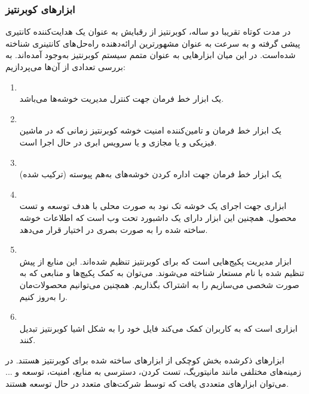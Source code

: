 \subsubsection{ابزارهای کوبرنتیز}

در مدت کوتاه تقریبا دو ساله، کوبرنتیز از رقبایش به عنوان یک هدایت‌کننده کانتیری پیشی گرفته و به سرعت به عنوان مشهورترین ارائه‌دهنده راه‌حل‌های کانتینری
شناخته شده‌است. در این میان ابزارهایی به عنوان متمم سیستم کوبرنتیز به‌وجود آمده‌اند. به بررسی تعدادی از آن‌ها می‌پردازیم:
\begin{enumerate} 
	
	\item
	\\
	یک ابزار خط فرمان
	جهت کنترل مدیریت خوشه‌ها می‌باشد.	
	
	\item
	\\
	یک ابزار خط فرمان و تامین‌کننده امنیت خوشه کوبرنتیز زمانی که در ماشین فیزیکی و یا مجازی و یا سرویس ابری در حال اجرا است. 	
	\item
	\\
	یک ابزار خط فرمان جهت اداره کردن خوشه‌های به‌هم پیوسته (ترکیب شده) 	
	\item
	\\
	ابزاری جهت اجرای یک خوشه تک نود به صورت محلی با هدف توسعه و تست محصول. همچنین این ابزار دارای یک داشبورد تحت وب است که اطلاعات خوشه ساخته شده را به صورت بصری در اختیار قرار می‌دهد.
	
	\item
	\\
	ابزار مدیریت پکیج‌هایی است که برای کوبرنتیز تنظیم شده‌اند. این منابع از پیش تنظیم شده با نام مستعار
	شناخته می‌شوند. می‌توان به کمک
	پکیچ‌ها و منابعی که به صورت شخصی می‌سازیم را به اشتراک بگذاریم. همچنین می‌توانیم محصولات‌مان را به‌روز کنیم. 	
	
	\item
	\\
	ابزاری است که به کاربران کمک می‌کند فایل
	خود را به شکل اشیا کوبرنتیز تبدیل کنند.    	
	
	
\end{enumerate}

ابزارهای ذکر‌شده بخش کوچکی از ابزارهای ساخته شده برای کوبرنتیز هستند. در زمینه‌های مختلفی مانند مانیتوریگ، تست کردن، دسترسی به منابع، امنیت، توسعه و ... می‌توان ابزارهای متعددی یافت که توسط شرکت‌های متعدد در حال توسعه هستند.

